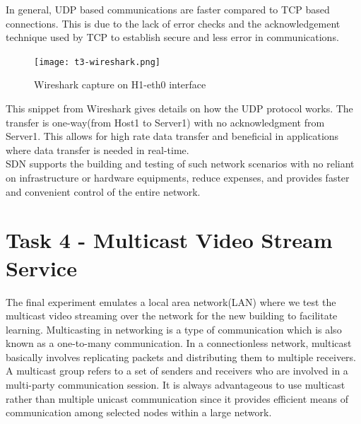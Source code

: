 \documentclass{article}
\begin{document}
\newpage
\par In general, UDP based communications are faster compared to TCP based connections. This is due to the lack of error checks and the acknowledgement technique used by TCP to establish secure and less error in communications. \\
	\begin{figure}[h]
		\centering
		\texttt{[image: t3-wireshark.png]}
		\caption{Wireshark capture on H1-eth0 interface}
		\label{fig:t3-4}
	\end{figure}
\par This snippet from Wireshark gives details on how the UDP protocol works. The transfer is one-way(from Host1 to Server1) with no acknowledgment from Server1. This allows for high rate data transfer and beneficial in applications where data transfer is needed in real-time. \\ SDN supports the building and testing of such network scenarios with no reliant on infrastructure or hardware equipments, reduce expenses, and provides faster and convenient control of the entire network.

\newpage
\section{Task 4 - Multicast Video Stream Service}
The final experiment emulates a local area network(LAN) where we test the multicast video streaming over the network for the new building to facilitate learning. Multicasting\cite{0202020} in networking is a type of communication which is also known as a one-to-many communication. In a connectionless network, multicast basically involves replicating packets and distributing them to multiple receivers. A multicast group refers to a set of senders and receivers who are involved in a multi-party communication session. It is always advantageous to use multicast rather than multiple unicast communication since it provides efficient means of communication among selected nodes within a large network\cite{1010101}.
\end{document}
